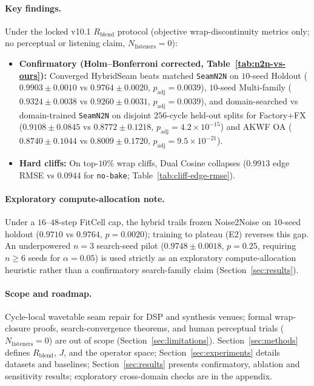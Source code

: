 \paragraph{Key findings.}
Under the locked v10.1 $R_{\mathrm{blend}}$ protocol (objective wrap-discontinuity metrics only; no perceptual or listening claim, $N_{\mathrm{listeners}}{=}0$):
\begin{itemize}
  \item \textbf{Confirmatory (Holm--Bonferroni corrected, Table~\ref{tab:n2n-vs-ours}):} Converged HybridSeam beats matched \texttt{SeamN2N} on $10$-seed Holdout ($0.9903{\pm}0.0010$ vs $0.9764{\pm}0.0020$, $p_{\mathrm{adj}}{=}0.0039$), $10$-seed Multi-family ($0.9324{\pm}0.0038$ vs $0.9260{\pm}0.0031$, $p_{\mathrm{adj}}{=}0.0039$), and domain-searched vs domain-trained \texttt{SeamN2N} on disjoint $256$-cycle held-out splits for Factory+FX ($0.9108{\pm}0.0845$ vs $0.8772{\pm}0.1218$, $p_{\mathrm{adj}}{=}4.2{\times}10^{-15}$) and AKWF OA ($0.8740{\pm}0.1044$ vs $0.8009{\pm}0.1720$, $p_{\mathrm{adj}}{=}9.5{\times}10^{-21}$).
  \item \textbf{Hard cliffs:} On top-$10\%$ wrap cliffs, Dual Cosine collapses ($0.9913$ edge RMSE vs $0.0944$ for \texttt{no-bake}; Table~\ref{tab:cliff-edge-rmse}).
\end{itemize}
\paragraph{Exploratory compute-allocation note.}
Under a $16$--$48$-step FitCell cap, the hybrid trails frozen Noise2Noise on $10$-seed holdout ($0.9710$ vs $0.9764$, $p{=}0.0020$); training to plateau (E2) reverses this gap.
An underpowered $n{=}3$ search-seed pilot ($0.9748{\pm}0.0018$, $p{=}0.25$, requiring $n{\ge}6$ seeds for $\alpha{=}0.05$) is used strictly as an exploratory compute-allocation heuristic rather than a confirmatory search-family claim (Section~\ref{sec:results}).
\paragraph{Scope and roadmap.}
Cycle-local wavetable seam repair for DSP and synthesis venues; formal wrap-closure proofs, search-convergence theorems, and human perceptual trials ($N_{\mathrm{listeners}}{=}0$) are out of scope (Section~\ref{sec:limitations}).
Section~\ref{sec:methods} defines $R_{\mathrm{blend}}$, $J$, and the operator space; Section~\ref{sec:experiments} details datasets and baselines; Section~\ref{sec:results} presents confirmatory, ablation and sensitivity results; exploratory cross-domain checks are in the appendix.


